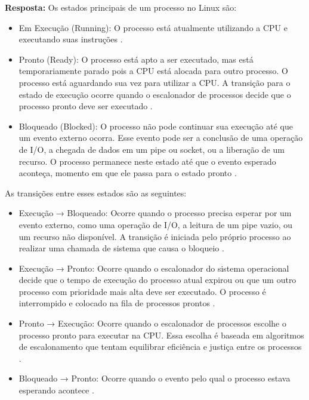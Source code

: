 \documentclass{article}
\begin{document}
\textbf{Resposta:} Os estados principais de um processo no Linux são:
\begin{itemize}
  
  \item Em Execução (Running): O processo está atualmente utilizando a CPU e executando suas instruções \parencite[p. 72]{tanenbaum2021}.
  \item Pronto (Ready): O processo está apto a ser executado, mas está temporariamente parado pois a CPU está alocada para outro processo. O processo está aguardando sua vez para utilizar a CPU. A transição para o estado de execução ocorre quando o escalonador de processos decide que o processo pronto deve ser executado \parencite[p. 72]{tanenbaum2021}.
  \item Bloqueado (Blocked): O processo não pode continuar sua execução até que um evento externo ocorra. Esse evento pode ser a conclusão de uma operação de I/O, a chegada de dados em um pipe ou socket, ou a liberação de um recurso. O processo permanece neste estado até que o evento esperado aconteça, momento em que ele passa para o estado pronto \parencite[p. 72]{tanenbaum2021}.
\end{itemize}

As transições entre esses estados são as seguintes:

\begin{itemize}
  \item Execução → Bloqueado: Ocorre quando o processo precisa esperar por um evento externo, como uma operação de I/O, a leitura de um pipe vazio, ou um recurso não disponível. A transição é iniciada pelo próprio processo ao realizar uma chamada de sistema que causa o bloqueio \parencite[p. 64]{tanenbaum2021}.
  \item Execução → Pronto: Ocorre quando o escalonador do sistema operacional decide que o tempo de execução do processo atual expirou ou que um outro processo com prioridade mais alta deve ser executado. O processo é interrompido e colocado na fila de processos prontos \parencite[p. 64]{tanenbaum2021}.
  \item Pronto → Execução: Ocorre quando o escalonador de processos escolhe o processo pronto para executar na CPU. Essa escolha é baseada em algoritmos de escalonamento que tentam equilibrar eficiência e justiça entre os processos \parencite[p. 64]{tanenbaum2021}.
  \item Bloqueado → Pronto: Ocorre quando o evento pelo qual o processo estava esperando acontece \parencite[p. 64]{tanenbaum2021}.
\end{itemize}
\end{document}
